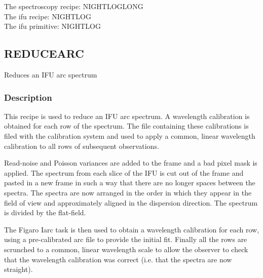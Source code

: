 \documentclass[twoside,11pt]{article}
\renewcommand{\_}{\texttt{\symbol{95}}}
\begin{document}
The spectroscopy recipe: NIGHT\_LOG\_LONG\\
The ifu recipe: NIGHT\_LOG\\
The ifu primitive: \_NIGHT\_LOG\_



\clearpage

\subsection{REDUCE\_ARC}



Reduces an IFU arc spectrum

\subsubsection*{Description}

This recipe is used to reduce an IFU arc spectrum. A wavelength
calibration is obtained for each row of the spectrum. The file
containing these calibrations is filed with the calibration system and
used to apply a common, linear wavelength calibration to all rows of
subsequent observations.



Read-noise and Poisson variances are added to the frame and a bad
pixel mask is applied. The spectrum from each slice of the IFU is cut
out of the frame and pasted in a new frame in such a way that there
are no longer spaces between the spectra. The spectra are now arranged
in the order in which they appear in the field of view and
approximately aligned in the dispersion direction. The spectrum is
divided by the flat-field.



The Figaro Iarc task is then used to obtain a wavelength calibration for
each row, using a pre-calibrated arc file to provide the initial
fit. Finally all the rows are scrunched to a common, linear wavelength
scale to allow the observer to check that the wavelength calibration
was correct (i.e. that the spectra are now straight). 
\end{document}
